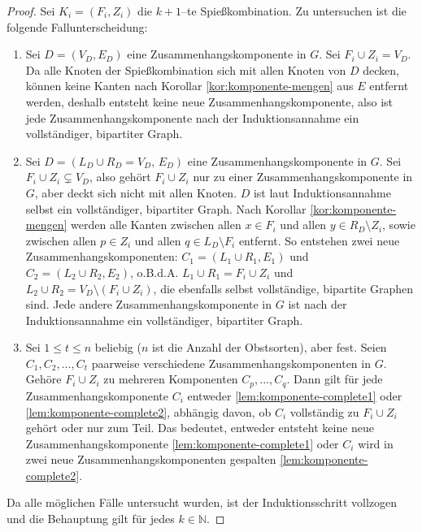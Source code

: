 \begin{proof}
Sei $K_i = (F_i, Z_i)$ die $k+1$--te Spießkombination.
Zu untersuchen ist die folgende Fallunterscheidung:
\begin{enumerate}[label={\upshape(\roman*)}]
  \item Sei $D = (V_D, E_D)$ eine Zusammenhangskomponente in $G$. Sei $F_i \cup Z_i = V_D$.
  Da alle Knoten der Spießkombination sich mit allen Knoten von $D$ decken,
  können keine Kanten nach Korollar \ref{kor:komponente-mengen} aus $E$ entfernt werden, deshalb
  entsteht keine neue Zusammenhangskomponente, also ist jede Zusammenhangskomponente
  nach der Induktionsannahme ein vollständiger, bipartiter Graph.\label{lem:komponente-complete1} 
  \item Sei $D = (L_D \cup R_D = V_D,\, E_D)$ eine Zusammenhangskomponente in $G$.
  Sei $F_i \cup Z_i \subsetneq V_D$, also gehört $F_i \cup Z_i$ nur zu einer
  Zusammenhangskomponente in $G$, aber deckt sich nicht mit allen Knoten.
  $D$ ist laut Induktionsannahme selbst ein vollständiger, bipartiter Graph.
  Nach Korollar \ref{kor:komponente-mengen} werden alle Kanten zwischen 
  allen $x \in F_i$ und allen $y \in R_D \setminus Z_i$,
  sowie zwischen allen $p \in Z_i$ und allen $q \in L_D \setminus F_i$ entfernt.
  So entstehen zwei neue Zusammenhangskomponenten: $C_1 = (L_1 \cup R_1, E_1)$ und $C_2 = (L_2 \cup R_2, E_2)$,
  o.B.d.A. $L_1 \cup R_1 = F_i \cup Z_i$ und $L_2 \cup R_2 = V_D \setminus (F_i \cup Z_i)$, die ebenfalls selbst 
  vollständige, bipartite Graphen sind.
  Jede andere Zusammenhangskomponente in $G$ ist
  nach der Induktionsannahme ein vollständiger, bipartiter Graph.\label{lem:komponente-complete2}

  \item Sei $1 \leqslant t \leqslant n$ beliebig ($n$ ist die Anzahl der Obstsorten), aber fest.
  Seien $C_1, C_2, ..., C_t$ paarweise verschiedene Zusammenhangskomponenten in $G$.
  Gehöre $F_i \cup Z_i$ zu mehreren Komponenten $C_p, ..., C_q$.
  Dann gilt für jede Zusammenhangskomponente $C_i$ entweder \ref{lem:komponente-complete1} 
  oder \ref{lem:komponente-complete2}, abhängig davon, ob $C_i$ vollständig zu $F_i \cup Z_i$
  gehört oder nur zum Teil. Das bedeutet, entweder entsteht keine neue Zusammenhangskomponente 
  \ref{lem:komponente-complete1} oder $C_i$ wird in zwei neue Zusammenhangskomponenten gespalten
  \ref{lem:komponente-complete2}.
\end{enumerate}

Da alle möglichen Fälle untersucht wurden, ist der Induktionsschritt vollzogen und die Behauptung gilt für jedes
$k \in \mathbb{N}$.
\end{proof}
